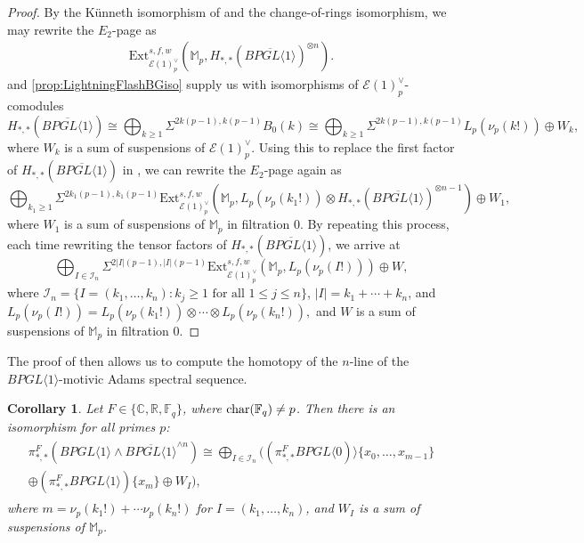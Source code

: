 \documentclass{amsart}
\newtheorem{cor}[theorem]{Corollary}
\theoremstyle{plain}
\numberwithin{theorem}{section}
\numberwithin{equation}{section}
\numberwithin{figure}{section}
\newcommand{\0}{\langle 0 \rangle }
\begin{document}
\begin{proof}
    By the K\"unneth isomorphism of  and the change-of-rings isomorphism, we may rewrite the $E_2$-page as
    \begin{align}
    \label{ss:mASS-E1-page-BPGL1-nline}
    \text{Ext}^{s,f,w}_{\mathcal{E}(1)^\vee_p}(\mathbb{M}_p, H_{*,*}(\overline{BPGL \langle 1 \rangle}) ^{\otimes n}).
    \end{align}
     and \cref{prop:LightningFlashBGiso} supply us with isomorphisms of $\mathcal{E}(1)^\vee_p$-comodules 
    \[H_{*,*}(\overline{BPGL \langle 1 \rangle}) \cong\bigoplus_{k \geq 1}\Sigma^{2k(p-1), k(p-1)}B_0(k) \cong \bigoplus_{k \geq 1} \Sigma^{2k(p-1), k(p-1)}L_p(\nu_p(k!)) \oplus W_k,\]
    where $W_k$ is a sum of suspensions of $\mathcal{E}(1)^\vee_p$.
    Using this to replace the first factor of $H_{*,*}(\overline{BPGL \langle 1 \rangle})$ in , we can rewrite the $E_2$-page again as
    \[\bigoplus_{k_1 \geq 1}\Sigma^{2k_1(p-1), k_1(p-1)}\text{Ext}_{\mathcal{E}(1)^\vee_p}^{s,f,w}(\mathbb{M}_p, L_p(\nu_p(k_1!)) \otimes H_{*,*}(\overline{BPGL \langle 1 \rangle})^{\otimes n-1}) \oplus W_1,\]
    where $W_1$ is a sum of suspensions of $\mathbb{M}_p$ in filtration 0.
    By repeating this process, each time rewriting the tensor factors of $H_{*,*}(\overline{BPGL \langle 1 \rangle})$, we arrive at
    \[\bigoplus_{I \in \mathcal{I}_n}\Sigma^{2|I|(p-1), |I|(p-1)}\text{Ext}^{s,f,w}_{\mathcal{E}(1)^\vee_p}(\mathbb{M}_p, L_p(\nu_p(I!))) \oplus W,\]
    where $\mathcal{I}_n = \{I=(k_1, \dots, k_n): k_j \geq 1 \text{ for all } 1 \leq j \leq n\}$, $|I| = k_1 + \cdots +k_n$, and $L_p(\nu_p(I!)) = L_p(\nu_p(k_1!)) \otimes \cdots \otimes L_p(\nu_p(k_n!)),$ and $W$ is a sum of suspensions of $\mathbb{M}_p$ in filtration 0.
\end{proof}

The proof of  then allows us to compute the homotopy of the $n$-line of the $BPGL \langle 1 \rangle$-motivic Adams spectral sequence.
\begin{cor}
\label{cor:n-line}
    Let $F \in \{\mathbb{C}, \mathbb{R}, \mathbb{F}_q\}$, where $\textup{char}(\mathbb{F}_q) \neq p$. Then there is an isomorphism for all primes $p$:
    \begin{align*}
    \begin{split}
    \pi_{*,*}^F(BPGL \langle 1 \rangle \wedge \overline{BPGL \langle 1 \rangle}^{\wedge n}) \cong \bigoplus_{I \in \mathcal{I}_n}((\pi_{*,*}^FBPGL \langle 0 )\rangle\{x_0, \dots, x_{m-1}\} \\
    \oplus (\pi_{*,*}^FBPGL \langle 1 \rangle)\{x_m\} \oplus W_I),
    \end{split}
    \end{align*}
    where $m = \nu_p(k_1!) + \cdots \nu_p(k_n!)$ for $I= (k_1, \dots, k_n)$, and $W_I$ is a sum of suspensions of $\mathbb{M}_p$.
\end{cor}
\end{document}
